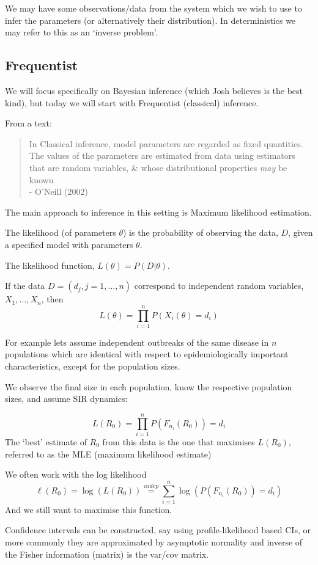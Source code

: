 \documentclass{X:/Documents/Coding/Latex/myassignment}
\begin{document}
We may have some observations/data from the system which we wish to use to infer the parameters (or alternatively their distribution). In deterministics we may refer to this as an `inverse problem'.

\subsection{Frequentist}

We will focus specifically on Bayesian inference (which Josh believes is the best kind), but today we will start with Frequentist (classical) inference. 

From a text:

\begin{verse}
\noindent
{\centering
In Classical inference, model parameters are regarded as fixed quantities. The values of the parameters are estimated from data using estimators that are random variables, \& whose distributional properties \textit{may} be known}\\
- O'Neill (2002)
\end{verse}
The main approach to inference in this setting is Maximum likelihood estimation. 

The likelihood (of parameters $\theta$) is the probability of observing the data, $D$, given a specified model with parameters $\theta$.

The likelihood function, $L(\theta) = P(D|\theta)$.

If the data $D = (d_j,j=1,\ldots,n)$ correspond to independent random variables, $X_1,\ldots,X_n$, then
\[L(\theta) = \prod_{i=1}^n P(X_i(\theta) = d_i)\]

For example lets assume independent outbreaks of the same disease in $n$ populations which are identical with respect to epidemiologically important characteristics, except for the population sizes.

We observe the final size in each population, know the respective population sizes, and assume SIR dynamics:

\[L(R_0) = \prod_{i=1}^n P(F_{n_i}(R_0)) = d_i\]
The `best' estimate of $R_0$ from this data is the one that maximises $L(R_0)$, referred to as the MLE (maximum likelihood estimate)

We often work with the log likelihood
\[\ell(R_0) = \log(L(R_0)) \stackrel{indep}= \sum_{i=1}^n \log \left(P(F_{n_i}(R_0)) = d_i\right)\]
And we still want to maximise this function.


Confidence intervals can be constructed, say using profile-likelihood based CIs, or more commonly they are approximated by asymptotic normality and inverse of the Fisher information (matrix) is the var/cov matrix.
\end{document}
